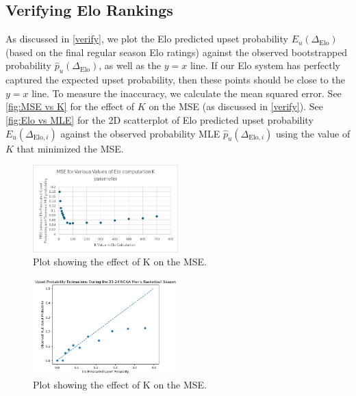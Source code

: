 \documentclass{article}
\begin{document}
\subsection{Verifying Elo Rankings}
As discussed in \autoref{verify}, we plot the Elo predicted upset probability $E_u(\Delta_{\text{Elo}})$ (based on the final regular season Elo ratings) against the observed bootstrapped probability $\hat{p}_u(\Delta_{\text{Elo}})$, as well as the $y=x$ line. If our Elo system has perfectly captured the expected upset probability, then these points should be close to the $y=x$ line. To measure the inaccuracy, we calculate the mean squared error. See \autoref{fig:MSE vs K} for the effect of $K$ on the MSE (as discussed in \autoref{verify}). See \autoref{fig:Elo vs MLE} for the 2D scatterplot of Elo predicted upset probability $E_u(\Delta_{\text{Elo}, i})$ against the observed probability MLE $\hat{p}_u(\Delta_{\text{Elo}, i})$ using the value of $K$ that minimized the MSE.

\begin{figure}[!htb]
    \begin{center}
      \includegraphics[width=0.5\textwidth]{MSE vs K.png}
    \end{center}
    \caption{Plot showing the effect of K on the MSE.}\label{fig:MSE vs K}
  \end{figure}

\begin{figure}[!htb]
    \begin{center}
      \includegraphics[width=0.5\textwidth]{Elo vs MLE.png}
    \end{center}
    \caption{Plot showing the effect of K on the MSE.}\label{fig:Elo vs MLE}
  \end{figure}
\end{document}
